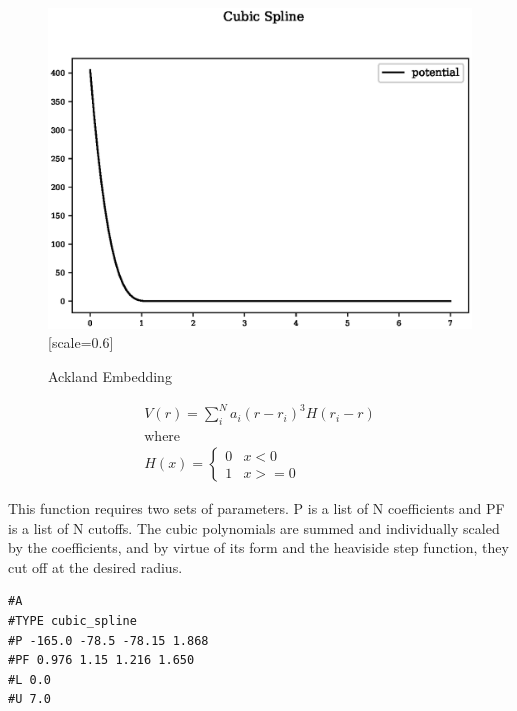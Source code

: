 \documentclass[12pt,twoside]{manual}
\begin{document}
\begin{appendices}
\begin{figure}[h]
  \begin{center}
    \includegraphics{img/plots/cubic_spline.eps}[scale=0.6]
    \caption{Ackland Embedding}
    \label{graph:graph1}
  \end{center}
\end{figure}

\begin{equation}
\begin{split}
V(r) = \sum_i^N a_i (r - r_i)^3 H(r_i - r) \\
\text{where } \\
H(x) = \left\{ \begin{matrix} 0 & x<0 \\  1 & x >= 0 \end{matrix} \right . 
\end{split}
\label{eq:cubicSpline}
\end{equation}

This function requires two sets of parameters.  P is a list of N coefficients and PF is a list of N cutoffs.  The cubic polynomials are summed and individually scaled by the coefficients, and by virtue of its form and the heaviside step function, they cut off at the desired radius. 

\begin{lstlisting}[style=pseudocode,caption={Cubic Splines}]
#A
#TYPE cubic_spline
#P -165.0 -78.5 -78.15 1.868
#PF 0.976 1.15 1.216 1.650
#L 0.0
#U 7.0
\end{lstlisting}






\end{appendices}
\end{document}

